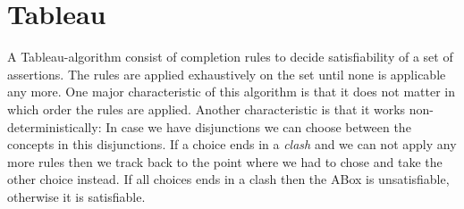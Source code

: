 \documentclass[a4paper,11pt]{scrartcl}
\theoremstyle{break}
\theoremstyle{definition}
\begin{document}
\section{Tableau}
A Tableau-algorithm consist of completion rules to decide satisfiability of a set of assertions. The rules are applied exhaustively on the set until none is applicable any more. One major characteristic of this algorithm is that it does not matter in which order the rules are applied. Another characteristic is that it works non-deterministically: In case we have disjunctions we can choose between the concepts in this disjunctions. If a choice ends in a \textit{clash} and we can not apply any more rules then we track back to the point where we had to chose and take the other choice instead. If all choices ends in a clash then the ABox is unsatisfiable, otherwise it is satisfiable.
\end{document}
